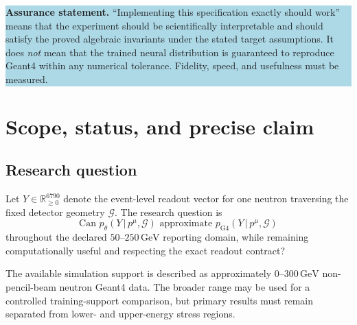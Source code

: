 \documentclass[11pt]{article}
\theoremstyle{definition}
\theoremstyle{remark}
\newcommand{\pG}{p_{\mathrm{G4}}}
\newcommand{\pM}{p_{\theta}}
\newcommand{\R}{\mathbb{R}}
\newcommand{\G}{\mathcal{G}}
\newcommand{\given}{\,\vert\,}
\newcommand{\GeV}{\,\mathrm{GeV}}
\begin{document}
\vspace{0.5em}
\noindent\colorbox{lightblue}{\parbox{0.96\textwidth}{
\textbf{Assurance statement.} ``Implementing this specification exactly should work'' means that the experiment should be scientifically interpretable and should satisfy the proved algebraic invariants under the stated target assumptions. It does \emph{not} mean that the trained neural distribution is guaranteed to reproduce Geant4 within any numerical tolerance. Fidelity, speed, and usefulness must be measured.
}}

\tableofcontents
\newpage

\section{Scope, status, and precise claim}

\subsection{Research question}
Let $Y\in\R_{\ge 0}^{6790}$ denote the event-level readout vector for one neutron traversing the fixed detector geometry $\G$. The research question is
\begin{equation}
  \text{Can }\pM(Y\given p^\mu,\G)\text{ approximate }\pG(Y\given p^\mu,\G)
\end{equation}
throughout the declared $50$--$250\GeV$ reporting domain, while remaining computationally useful and respecting the exact readout contract?

The available simulation support is described as approximately $0$--$300\GeV$ non-pencil-beam neutron Geant4 data. The broader range may be used for a controlled training-support comparison, but primary results must remain separated from lower- and upper-energy stress regions.
\end{document}
